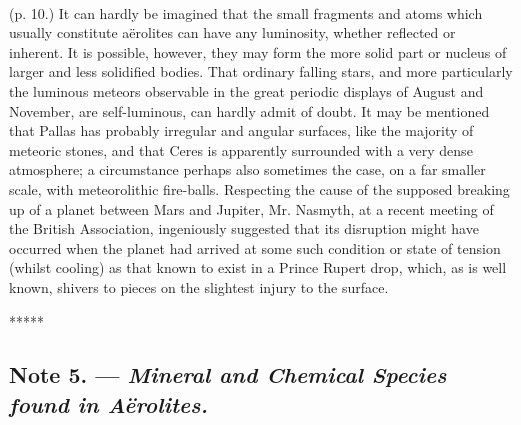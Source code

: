 \documentclass[a4paper, 12pt, oneside]{article}
\begin{document}
\paragraph{}
(p. 10.) It can hardly be imagined that the small fragments and atoms which usually constitute aërolites can have any luminosity, whether reflected or inherent. It is possible, however, they may form the more solid part or nucleus of larger and less solidified bodies. That ordinary falling stars, and more particularly the luminous meteors observable in the great periodic displays of August and November, are self-luminous, can hardly admit of doubt. It may be mentioned that Pallas has probably irregular and angular surfaces, like the majority of meteoric stones, and that Ceres is apparently surrounded with a very dense atmosphere; a circumstance perhaps also sometimes the case, on a far smaller scale, with meteorolithic fire-balls. Respecting the cause of the supposed breaking up of a planet between Mars and Jupiter, Mr. Nasmyth, at a recent meeting of the British Association, ingeniously suggested that its disruption might have occurred when the planet had arrived at some such condition or state of tension (whilst cooling) as that known to exist in a Prince Rupert drop, which, as is well known, shivers to pieces on the slightest injury to the surface.

\centerline{*\hspace{15mm}*\hspace{15mm}*\hspace{15mm}*\hspace{15mm}*}
\bigskip

\subsection{Note 5. --- \emph{Mineral and Chemical Species found in Aërolites.}}
\end{document}
